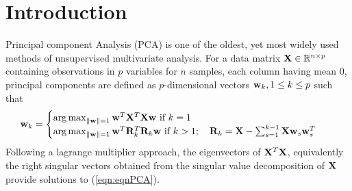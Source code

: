 \section{Introduction}

Principal component Analysis (PCA) is one of the oldest, yet most widely used methods of unsupervised multivariate analysis. For a data matrix ${\mathbf{X}} \in {\mathbb{R}}^{n \times p}$ containing observations in $p$ variables for $n$ samples, each column having mean 0, principal components are defined as $p$-dimensional vectors ${\bf{w}}_k, 1 \leq k \leq p$ such that
%
\begin{align}\label{eqn:eqnPCA}
{\bf{w}}_k &=
\begin{cases}
\operatorname*{arg\,max}_{\| {\bf{w}} \| = 1} {\bf{w}}^T {\mathbf{X}}^T {\mathbf{X}} {\bf{w}} \text{ if }k = 1\\
\operatorname*{arg\,max}_{\| {\bf{w}} \| = 1} {\bf{w}}^T {\mathbf{R}}_k^T {\mathbf{R}}_k {\bf{w}} \text{ if }k > 1;
\quad {\mathbf{R}}_k = {\mathbf{X}} - \sum_{s=1}^{k-1} {\mathbf{X}} {\bf{w}}_s {\bf{w}}_s^T
\end{cases} 
\end{align}
%
Following a lagrange multiplier approach, the eigenvectors of ${\mathbf{X}}^T {\mathbf{X}}$, equivalently the right singular vectors obtained from the singular value decomposition of ${\mathbf{X}}$ provide solutions to (\ref{eqn:eqnPCA}).